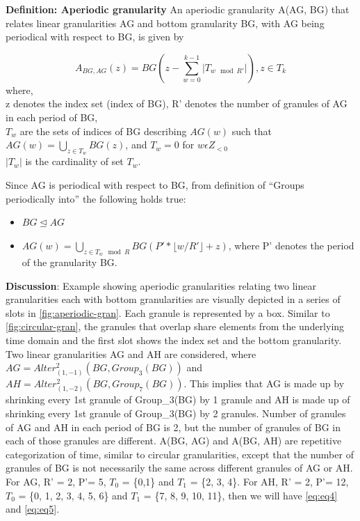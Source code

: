 \documentclass[12pt]{article}
\providecommand{\tightlist}{%
  \setlength{\itemsep}{0pt}\setlength{\parskip}{0pt}}
\begin{document}
\textbf{Definition: Aperiodic granularity} An aperiodic granularity
A(AG, BG) that relates linear granularities AG and bottom granularity
BG, with AG being periodical with respect to BG, is given by

\begin{equation}\label{eq:eq3}
A_{BG, AG}(z) = BG(z - \sum_{w=0}^{k-1}\vert T_{w \mod R'} \vert), z \in T_k
\end{equation} where,\\
z denotes the index set (index of BG), R' denotes the number of granules
of AG in each period of BG,\\
\(T_w\) are the sets of indices of BG describing \(AG(w)\) such that
\(AG(w) = \bigcup_{z \in T_w}BG(z)\), and \(T_w = 0\) for
\(w \epsilon Z_{<0}\)\\
\(\vert T_w \vert\) is the cardinality of set \(T_w\).

Since AG is periodical with respect to BG, from definition of ``Groups
periodically into'' the following holds true:

\begin{itemize}
\tightlist
\item
  \(BG \trianglelefteq AG\)
\item
  \(AG(w) = \bigcup_{z \in T_w \mod R}BG(P'*\lfloor w/R' \rfloor + z)\),
  where P' denotes the period of the granularity BG.
\end{itemize}

\textbf{Discussion}: Example showing aperiodic granularities relating
two linear granularities each with bottom granularities are visually
depicted in a series of slots in \autoref{fig:aperiodic-gran}. Each
granule is represented by a box. Similar to \autoref{fig:circular-gran},
the granules that overlap share elements from the underlying time domain
and the first slot shows the index set and the bottom granularity. Two
linear granularities AG and AH are considered, where
\(AG = Alter^{2}_{(1,-1)}(BG, Group_3(BG))\) and
\(AH = Alter^{2}_{(1,-2)}(BG, Group_7(BG))\). This implies that AG is
made up by shrinking every 1st granule of Group\_3(BG) by 1 granule and
AH is made up of shrinking every 1st granule of Group\_3(BG) by 2
granules. Number of granules of AG and AH in each period of BG is 2, but
the number of granules of BG in each of those granules are different.
A(BG, AG) and A(BG, AH) are repetitive categorization of time, similar
to circular granularities, except that the number of granules of BG is
not necessarily the same across different granules of AG or AH. For AG,
R' = 2, P'= 5, \(T_0\) = \{0,1\} and \(T_1\) = \{2, 3, 4\}. For AH, R' =
2, P'= 12, \(T_0\) = \{0, 1, 2, 3, 4, 5, 6\} and \(T_1\) = \{7, 8, 9,
10, 11\}, then we will have \autoref{eq:eq4} and \autoref{eq:eq5}.
\end{document}

